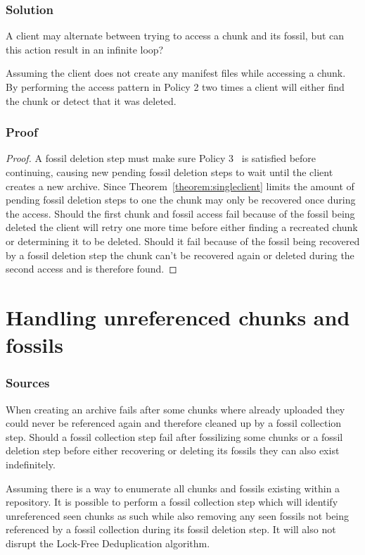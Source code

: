\documentclass[english,utf8,aspectratio=169]{beamer}
\begin{document}
    \begin{frame}
        \frametitle{Solution}
        A client may alternate between trying to access a chunk and its fossil, but can this
        action result in an infinite loop?
        \begin{theorem}
            \label{theorem:nonatomic-chunks}
            Assuming the client does not create any manifest files while accessing a chunk.
            By performing the access pattern in Policy 2 two times a client will either find the
            chunk or detect that it was deleted.
        \end{theorem}
    \end{frame}

    \begin{frame}
        \frametitle{Proof}
        \begin{proof}
            A fossil deletion step must make sure Policy 3~\cite{Duplicacy} is satisfied before
            continuing, causing new pending fossil deletion steps to wait until the client creates
            a new archive.
            Since Theorem~\ref{theorem:singleclient} limits the amount of pending fossil deletion
            steps to one the chunk may only be recovered once during the access.
            Should the first chunk and fossil access fail because of the fossil being deleted the
            client will retry one more time before either finding a recreated chunk or determining
            it to be deleted.
            Should it fail because of the fossil being recovered by a fossil deletion step the chunk
            can't be recovered again or deleted during the second access and is therefore found.
        \end{proof}
    \end{frame}

    \section{Handling unreferenced chunks and fossils}
    \begin{frame}
        \frametitle{Sources}
        When creating an archive fails after some chunks where already uploaded they could never be
        referenced again and therefore cleaned up by a fossil collection step.
        Should a fossil collection step fail after fossilizing some chunks or a fossil deletion step
        before either recovering or deleting its fossils they can also exist indefinitely.
        \begin{theorem}
            Assuming there is a way to enumerate all chunks and fossils existing within a repository.
            It is possible to perform a fossil collection step which will identify unreferenced seen
            chunks as such while also removing any seen fossils not being referenced by a fossil
            collection during its fossil deletion step.
            It will also not disrupt the Lock-Free Deduplication algorithm.
        \end{theorem}
    \end{frame}
\end{document}
